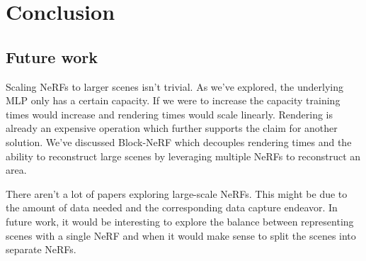 \chapter{Conclusion}

\begin{comment}
- Loop back to the introduction, review - claim - agenda
    - In this thesis, we have seen how we can reconstruct 3D scenes and render novel views by optimizing NeRFs on 2D input images.
    - The pipeline for creating NeRFs has become greatly simplified recently. As we've seen we can without problems optimize a NeRF in ~4.5 minutes.
\end{comment}

\section{Future work}
Scaling NeRFs to larger scenes isn't trivial. As we've explored, the underlying MLP only has a certain capacity. If we were to increase the capacity training times would increase and rendering times would scale linearly. Rendering is already an expensive operation which further supports the claim for another solution. We've discussed Block-NeRF which decouples rendering times and the ability to reconstruct large scenes by leveraging multiple NeRFs to reconstruct an area.

There aren't a lot of papers exploring large-scale NeRFs. This might be due to the amount of data needed and the corresponding data capture endeavor. In future work, it would be interesting to explore the balance between representing scenes with a single NeRF and when it would make sense to split the scenes into separate NeRFs.